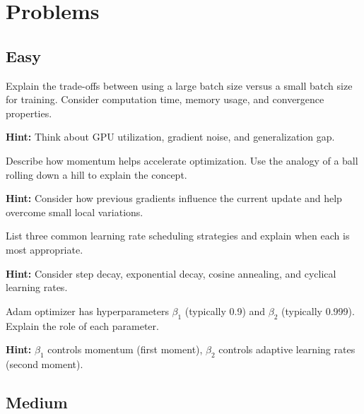 
\section*{Problems}

\subsection*{Easy}

\begin{problem}
Explain the trade-offs between using a large batch size versus a small batch size for training. Consider computation time, memory usage, and convergence properties.

\textbf{Hint:} Think about GPU utilization, gradient noise, and generalization gap.
\end{problem}

\begin{problem}
Describe how momentum helps accelerate optimization. Use the analogy of a ball rolling down a hill to explain the concept.

\textbf{Hint:} Consider how previous gradients influence the current update and help overcome small local variations.
\end{problem}

\begin{problem}
List three common learning rate scheduling strategies and explain when each is most appropriate.

\textbf{Hint:} Consider step decay, exponential decay, cosine annealing, and cyclical learning rates.
\end{problem}

\begin{problem}
Adam optimizer has hyperparameters $\beta_1$ (typically 0.9) and $\beta_2$ (typically 0.999). Explain the role of each parameter.

\textbf{Hint:} $\beta_1$ controls momentum (first moment), $\beta_2$ controls adaptive learning rates (second moment).
\end{problem}

\subsection*{Medium}

